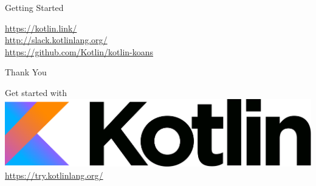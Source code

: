 \begin{frame}{Getting Started}
	\begin{center}
		\LARGE \href{https://kotlin.link/}{https://kotlin.link/}\\
		\href{http://slack.kotlinlang.org/}{http://slack.kotlinlang.org/}\\
		\href{https://github.com/Kotlin/kotlin-koans}{https://github.com/Kotlin/kotlin-koans}
	\end{center}
\end{frame}

\begin{frame}{Thank You}
	\begin{center}
		\LARGE Get started with\\
		\vspace{.5cm}
		\includegraphics[width=.5\paperwidth]{figures/kotlinLogo2}\\
		\vspace{.5cm}
		\href{https://try.kotlinlang.org/}{https://try.kotlinlang.org/}
	\end{center}
\end{frame}